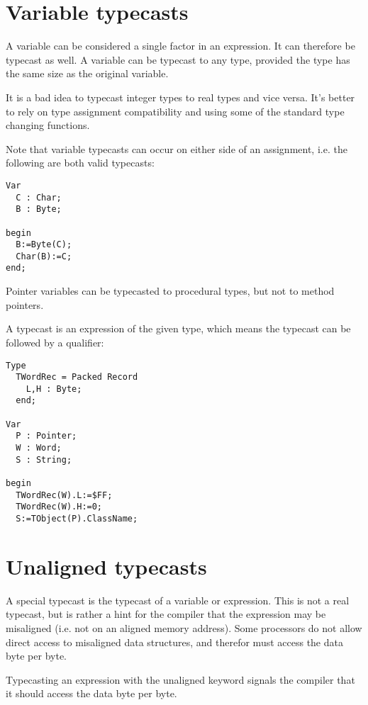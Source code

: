 \section{Variable typecasts}
A variable can be considered a single factor in an expression. It can
therefore be typecast as well. A variable can be typecast to any type,
provided the type has the same size as the original variable. 

It is a bad idea to typecast integer types to real types and vice versa.
It's better to rely on type assignment compatibility and using some of the
standard type changing functions.

Note that variable typecasts can occur on either side of an assignment,
i.e. the following are both valid typecasts:
\begin{verbatim}
Var
  C : Char;
  B : Byte;

begin
  B:=Byte(C);
  Char(B):=C;
end;
\end{verbatim}
Pointer variables can be typecasted to procedural types, but not
to method pointers.

A typecast is an expression of the given type, which means the
typecast can be followed by a qualifier:
\begin{verbatim}
Type 
  TWordRec = Packed Record
    L,H : Byte;
  end;

Var
  P : Pointer;
  W : Word;
  S : String;

begin
  TWordRec(W).L:=$FF;
  TWordRec(W).H:=0;
  S:=TObject(P).ClassName;
\end{verbatim}

\section{Unaligned typecasts}
A special typecast is the  typecast of a variable or
expression. This is not a real typecast, but is rather a hint for the 
compiler that the expression may be misaligned (i.e. not on an aligned
memory address). Some processors do not allow direct access to misaligned
data structures, and therefor must access the data byte per byte.

Typecasting an expression with the unaligned keyword signals the compiler
that it should access the data byte per byte.


